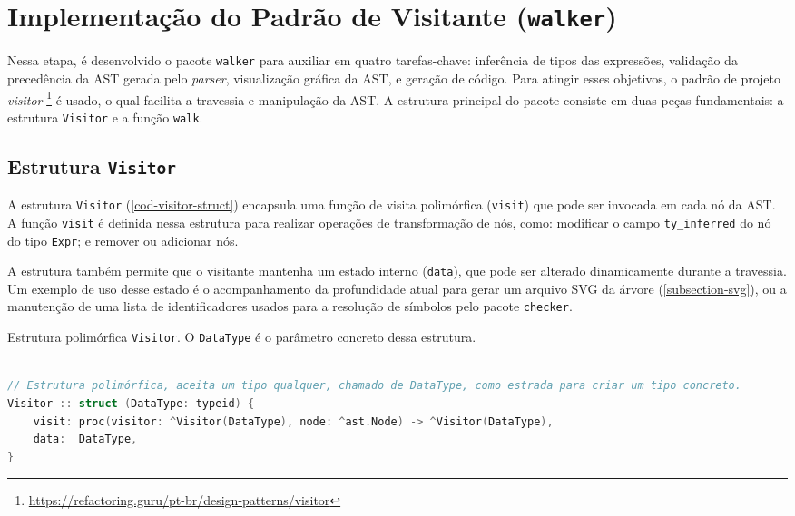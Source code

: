 
\section{Implementação do Padrão de Visitante (\texttt{walker})} \label{section-walker}


Nessa etapa, é desenvolvido o pacote \texttt{walker} para auxiliar em quatro tarefas-chave: inferência de tipos das expressões, validação da precedência da AST gerada pelo \textit{parser}, visualização gráfica da AST, e geração de código. Para atingir esses objetivos, o padrão de projeto \textit{visitor} \footnote{\url{https://refactoring.guru/pt-br/design-patterns/visitor}} é usado, o qual facilita a travessia e manipulação da AST. A estrutura principal do pacote consiste em duas peças fundamentais: a estrutura \texttt{Visitor} e a função \texttt{walk}.

\subsection{Estrutura \texttt{Visitor}}

A estrutura \texttt{Visitor} (\autoref{cod-visitor-struct}) encapsula uma função de visita polimórfica (\texttt{visit}) que pode ser invocada em cada nó da AST. A função \texttt{visit} é definida nessa estrutura para realizar operações de transformação de nós, como: modificar o campo \texttt{ty\_inferred} do nó do tipo \texttt{Expr}; e remover ou adicionar nós.

A estrutura também permite que o visitante mantenha um estado interno (\texttt{data}), que pode ser alterado dinamicamente durante a travessia. Um exemplo de uso desse estado é o acompanhamento da profundidade atual para gerar um arquivo SVG da árvore (\autoref{subsection-svg}), ou a manutenção de uma lista de identificadores usados para a resolução de símbolos pelo pacote \texttt{checker}.



\begin{codigo}[!ht]
    \caption{\small Estrutura polimórfica \texttt{Visitor}. O \texttt{DataType} é o parâmetro concreto dessa estrutura.}
        \label{cod-visitor-struct}
\begin{lstlisting}[language = C]

// Estrutura polimórfica, aceita um tipo qualquer, chamado de DataType, como estrada para criar um tipo concreto.
Visitor :: struct (DataType: typeid) {
    visit: proc(visitor: ^Visitor(DataType), node: ^ast.Node) -> ^Visitor(DataType),
    data:  DataType,
}
\end{lstlisting}
\end{codigo}

